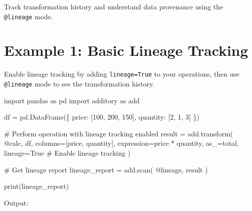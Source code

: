 \documentclass[
  letterpaper,
]{scrbook}
\newenvironment{Shaded}{\begin{snugshade}}{\end{snugshade}}
\newcommand{\BuiltInTok}[1]{\textcolor[rgb]{0.00,0.23,0.31}{#1}}
\newcommand{\CommentTok}[1]{\textcolor[rgb]{0.37,0.37,0.37}{#1}}
\newcommand{\DecValTok}[1]{\textcolor[rgb]{0.68,0.00,0.00}{#1}}
\newcommand{\ImportTok}[1]{\textcolor[rgb]{0.00,0.46,0.62}{#1}}
\newcommand{\NormalTok}[1]{\textcolor[rgb]{0.00,0.23,0.31}{#1}}
\newcommand{\OperatorTok}[1]{\textcolor[rgb]{0.37,0.37,0.37}{#1}}
\newcommand{\StringTok}[1]{\textcolor[rgb]{0.13,0.47,0.30}{#1}}
\newcommand{\VariableTok}[1]{\textcolor[rgb]{0.07,0.07,0.07}{#1}}
\begin{document}
Track transformation history and understand data provenance using the
\texttt{@lineage} mode.

\section{Example 1: Basic Lineage
Tracking}\label{example-1-basic-lineage-tracking}

Enable lineage tracking by adding \texttt{lineage=True} to your
operations, then use \texttt{@lineage} mode to see the transformation
history.

\begin{Shaded}
\begin{Highlighting}[]
\ImportTok{import}\NormalTok{ pandas }\ImportTok{as}\NormalTok{ pd}
\ImportTok{import}\NormalTok{ additory }\ImportTok{as}\NormalTok{ add}

\NormalTok{df }\OperatorTok{=}\NormalTok{ pd.DataFrame(\{}
    \StringTok{\textquotesingle{}price\textquotesingle{}}\NormalTok{: [}\DecValTok{100}\NormalTok{, }\DecValTok{200}\NormalTok{, }\DecValTok{150}\NormalTok{],}
    \StringTok{\textquotesingle{}quantity\textquotesingle{}}\NormalTok{: [}\DecValTok{2}\NormalTok{, }\DecValTok{1}\NormalTok{, }\DecValTok{3}\NormalTok{]}
\NormalTok{\})}

\CommentTok{\# Perform operation with lineage tracking enabled}
\NormalTok{result }\OperatorTok{=}\NormalTok{ add.transform(}
    \StringTok{\textquotesingle{}@calc\textquotesingle{}}\NormalTok{,}
\NormalTok{    df,}
\NormalTok{    columns}\OperatorTok{=}\NormalTok{[}\StringTok{\textquotesingle{}price\textquotesingle{}}\NormalTok{, }\StringTok{\textquotesingle{}quantity\textquotesingle{}}\NormalTok{],}
\NormalTok{    expression}\OperatorTok{=}\StringTok{\textquotesingle{}price * quantity\textquotesingle{}}\NormalTok{,}
\NormalTok{    as\_}\OperatorTok{=}\StringTok{\textquotesingle{}total\textquotesingle{}}\NormalTok{,}
\NormalTok{    lineage}\OperatorTok{=}\VariableTok{True}  \CommentTok{\# Enable lineage tracking}
\NormalTok{)}

\CommentTok{\# Get lineage report}
\NormalTok{lineage\_report }\OperatorTok{=}\NormalTok{ add.scan(}
    \StringTok{\textquotesingle{}@lineage\textquotesingle{}}\NormalTok{,}
\NormalTok{    result}
\NormalTok{)}

\BuiltInTok{print}\NormalTok{(lineage\_report)}
\end{Highlighting}
\end{Shaded}

Output:
\end{document}
